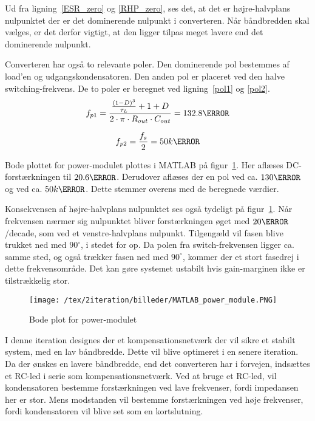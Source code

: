 \noindent Ud fra ligning~\ref{ESR_zero} og \ref{RHP_zero}, ses det, at det er højre-halvplans nulpunktet der er det dominerende nulpunkt i converteren. Når båndbredden skal vælges, er det derfor vigtigt, at den ligger tilpas meget lavere end det dominerende nulpunkt.

Converteren har også to relevante poler. Den dominerende pol bestemmes af load'en og udgangskondensatoren. Den anden pol er placeret ved den halve switching-frekvens. De to poler er beregnet ved ligning~\ref{pol1} og \ref{pol2}.
\begin{equation} \label{pol1}
f_{p1} = \frac{\frac{(1-D)^3}{\tau_L} + 1 + D}{2\cdot \pi \cdot R_{out} \cdot C_{out}} = 132.8\hertz
\end{equation}

\begin{equation} \label{pol2}
f_{p2} = \frac{f_s}{2} = 50k\hertz
\end{equation}

\noindent Bode plottet for power-modulet plottes i MATLAB på figur~\ref{fig:MATLAB_power_module}. Her aflæses DC-forstærkningen til $20.6\decibel$. Derudover aflæses der en pol ved ca. $130\hertz$ og ved ca. $50k\hertz$. Dette stemmer overens med de beregnede værdier.

Konsekvensen af højre-halvplans nulpunktet ses også tydeligt på figur~\ref{fig:MATLAB_power_module}. Når frekvensen nærmer sig nulpunktet bliver forstærkningen øget med $20 \decibel$/decade, som ved et venstre-halvplans nulpunkt. Tilgengæld vil fasen blive trukket ned med $90^\circ$, i stedet for op. Da polen fra switch-frekvensen ligger ca. samme sted, og også trækker fasen ned med $90^\circ$, kommer der et stort fasedrej i dette frekvensområde. Det kan gøre systemet ustabilt hvis gain-marginen ikke er tilstrækkelig stor. 

\begin{figure}[H]
	\center
	\texttt{[image: /tex/2iteration/billeder/MATLAB\_power\_module.PNG]}
	\caption{Bode plot for power-modulet}
	\label{fig:MATLAB_power_module}
\end{figure}

I denne iteration designes der et kompensationsnetværk der vil sikre et stabilt system, med en lav båndbredde. Dette vil blive optimeret i en senere iteration. 
Da der ønskes en lavere båndbredde, end det converteren har i forvejen, indsættes et RC-led i serie som kompensationsnetværk. Ved at bruge et RC-led, vil kondensatoren bestemme forstærkningen ved lave frekvenser, fordi impedansen her er stor. Mens modstanden vil bestemme forstærkningen ved høje frekvenser, fordi kondensatoren vil blive set som en kortslutning. 

